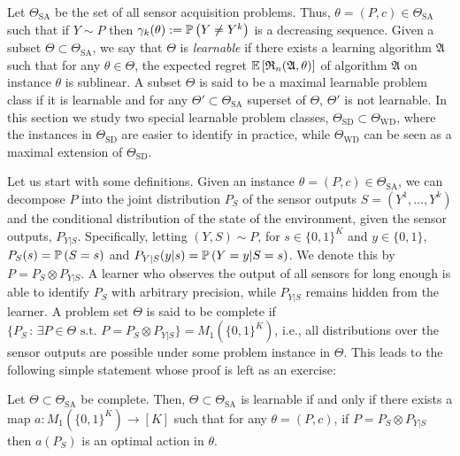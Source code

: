 \newcommand{\SA}{\mathrm{SA}}
\newcommand{\SD}{\mathrm{SD}}
\newcommand{\WD}{\mathrm{WD}}
\newcommand{\TSA}{\Theta_{\SA}}
\newcommand{\Alg}{\mathfrak{A}}
\newcommand{\TSD}{\Theta_{\SD}}
\newcommand{\TWD}{\Theta_{\WD}}
Let $\TSA$ be the set of all sensor acquisition problems. 
Thus, $\theta = (P,c)\in \TSA$ such that if $Y\sim P$ then $\gamma_k(\theta):=\mathbb{P}\left(Y\ne Y^k\right)$ 
is a decreasing sequence.
Given a subset $\Theta\subset \TSA$, we say that $\Theta$ is \emph{learnable} 
if there exists a learning algorithm $\Alg$ such that
for any $\theta\in \Theta$, the expected regret $\EE{ \Regret_n(\Alg,\theta) }$ 
of algorithm $\Alg$ on instance $\theta$ is sublinear.
A subset $\Theta$ is said to be a maximal learnable problem class if it is learnable and for any $\Theta'\subset \TSA$ superset
of $\Theta$, $\Theta'$ is not learnable.
In this section we study two special learnable problem classes, $\TSD\subset \TWD$, where the instances in $\TSD$ are easier to identify in practice, while $\TWD$ can be seen as a maximal extension of $\TSD$.

Let us start with some definitions.
Given an instance $\theta = (P,c)\in \TSA$, we can decompose $P$ into the joint distribution $P_S$ of the sensor outputs $S = (Y^1,\dots,Y^k)$ and the conditional distribution of the state of the environment, given the sensor outputs, $P_{Y|S}$.
Specifically, letting $(Y,S)\sim P$, for $s\in \{0,1\}^K$ and $y\in \{0,1\}$, $P_S(s) = \mathbb{P}\left(S = s\right)$ and $P_{Y|S}(y|s) = \mathbb{P}\left(Y=y|S=s\right)$. We denote this by $P = P_S \otimes P_{Y|S}$.
A learner who observes the output of all sensors for long enough is able to identify $P_S$ with arbitrary precision, while $P_{Y|S}$ remains hidden from the learner.
A problem set $\Theta$ is said to be complete if $\{P_S\,:\, \exists P\in \Theta \text{ s.t. } P = P_S \otimes P_{Y|S} \}=M_1( \{0,1\}^K )$, i.e., all distributions over the sensor outputs are possible under some problem instance in $\Theta$.
 This leads to the following simple statement whose proof is left as an exercise:
\begin{proposition}
\label{prop:learnablemap}
Let $\Theta \subset \TSA$ be complete. Then,
$\Theta\subset \TSA$ is learnable if and only if there exists a map $a: M_1( \{0,1\}^K ) \to [K]$ such that 
for any $\theta= (P,c)$, if $P = P_S \otimes P_{Y|S}$ then $a(P_S)$ is an optimal action in $\theta$.
\end{proposition}


